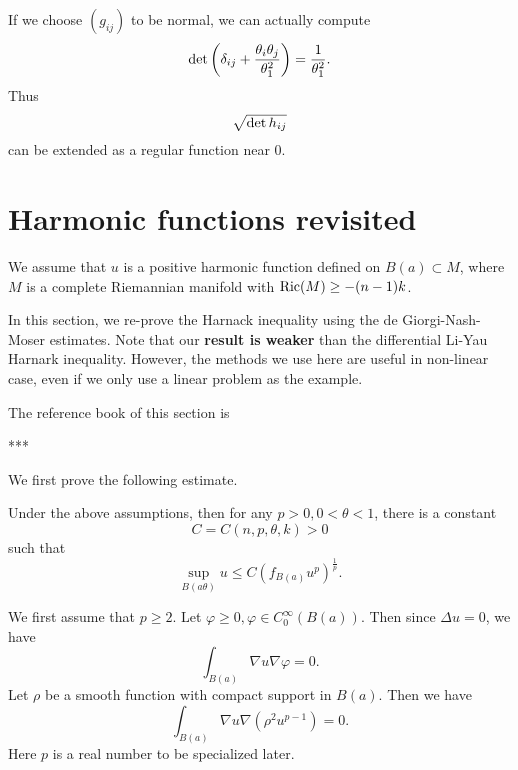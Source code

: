 If we choose $ (g_{ij}) $ to be normal, we can actually compute 
%
\[ {\rm det}\left( \delta_{ij} + \frac{\theta_i \theta_j}{\theta^2_1} \right) = \frac{1}{\theta^2_1}.\]
%
Thus 
%
\[ \sqrt{{\rm det}\,h_{ij}} \]
can be extended as a regular function near 0.


\section{Harmonic functions revisited}\label{Harmonic_functions}
We assume that $ u$ is a positive harmonic function defined on $ B(a) \subset M $, where $ M$ is a complete Riemannian manifold with ${\rm Ric} (M) \geq - (n-1) k $.

In this section, we re-prove the Harnack inequality using the de Giorgi-Nash-Moser estimates. Note that our {\bf result is weaker} than the differential Li-Yau Harnark inequality. However, the methods we use here are useful in non-linear case, even if we only  use a linear problem as the example.

The reference book of this section is 

***

We first prove the following estimate.

\begin{theorem} Under the above assumptions, then for any $ p > 0 , 0 < \theta < 1 $, there is a constant 
%
\[ C= C (n, p, \theta, k ) > 0 \]
%
 such that 
%
\[ \sup_{B(a\theta)} u \leq C (f _{B(a)} u^p ) ^{\frac{1}{p}}.\]
\end{theorem}

 We first assume that $ p \geq 2$.
Let $ \varphi \geq 0 , \varphi \in C^\infty_0 (B(a))$. Then since  $ \Delta u = 0 $, we have 
%
\[ \int _{B(a)} \nabla u \nabla \varphi = 0. \]
%
Let $\rho$ be a smooth function with compact support in $ B(a)$. Then we have 
%
\[ \int _{B(a)} \nabla u \nabla (\rho^2 u ^{p-1} )  = 0.\]
%
Here $p$ is a real number to be specialized later.

